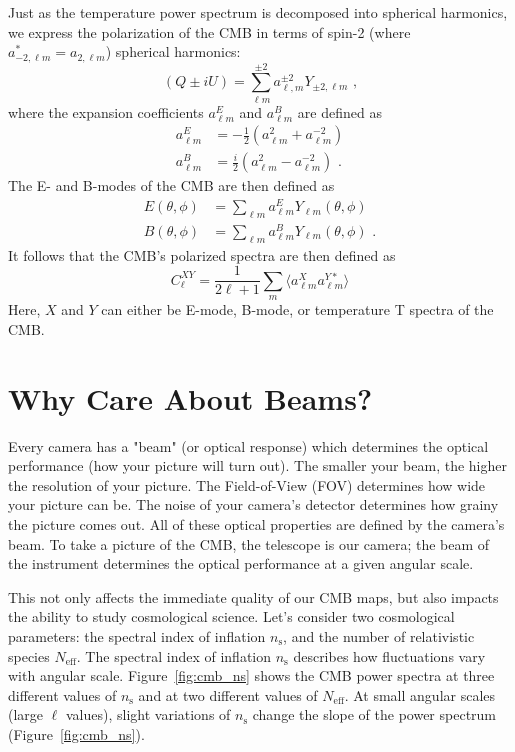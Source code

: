 Just as the temperature power spectrum is decomposed into spherical harmonics, we express the polarization of the CMB in terms of spin-2 (where $a^*_{-2,\ell m} = a_{2,\ell m}$) spherical harmonics:
\begin{equation}
(Q \pm iU) = \sum_{\ell m}^{\pm 2} a^{\pm 2}_{\ell ,m} Y_{\pm2,\ell m} \text{ ,}
\end{equation}
where the expansion coefficients $a_{\ell m }^E$ and $a_{\ell m }^B$ are defined as
\begin{equation}
\begin{split}
    a_{\ell m }^E & = -\frac{1}{2}(a_{\ell m}^2 + a_{\ell m}^{-2}) \\
    a_{\ell m }^B & = \frac{i}{2}(a_{\ell m}^2 - a_{\ell m}^{-2}) \text{ .}
\end{split}
\end{equation}
The E- and B-modes of the CMB are then defined as
\begin{equation}
\begin{split}
    E(\theta,\phi) & = \sum_{\ell m} a_{\ell m }^E Y_{\ell m}(\theta,\phi) \\
    B(\theta,\phi) & = \sum_{\ell m} a_{\ell m }^B Y_{\ell m}(\theta,\phi) \text{ .}
\end{split}
\end{equation}
It follows that the CMB's polarized spectra are then defined as
\begin{equation}
    C_{\ell}^{XY} = \frac{1}{2\ell+1}\sum_m \langle a_{\ell m}^{X} a_{\ell m}^{Y*} \rangle 
\end{equation}
Here, $X$ and $Y$ can either be E-mode, B-mode, or temperature T spectra of the CMB.

\section{Why Care About Beams?}
Every camera has a "beam" (or optical response) which determines the optical performance (how your picture will turn out).  The smaller your beam, the higher the resolution of your picture.   The Field-of-View (FOV) determines how wide your picture can be.  The noise of your camera's detector determines how grainy the picture comes out.  All of these optical properties are defined by the camera's beam.  To take a picture of the CMB, the telescope is our camera; the beam of the instrument determines the optical performance at a given angular scale.  

This not only affects the immediate quality of our CMB maps, but also impacts the ability to study cosmological science.  Let's consider two cosmological parameters: the spectral index of inflation $n_{\text{s}}$, and the number of relativistic species $N_{\text{eff}}$.  The spectral index of inflation $n_{\text{s}}$ describes how fluctuations vary with angular scale.  Figure~\ref{fig:cmb_ns} shows the CMB power spectra at three different values of $n_{\text{s}}$ and at two different values of $N_{\text{eff}}$.  At small angular scales (large $\ell$ values), slight variations of $n_{\text{s}}$ change the slope of the power spectrum (Figure~\ref{fig:cmb_ns}).

